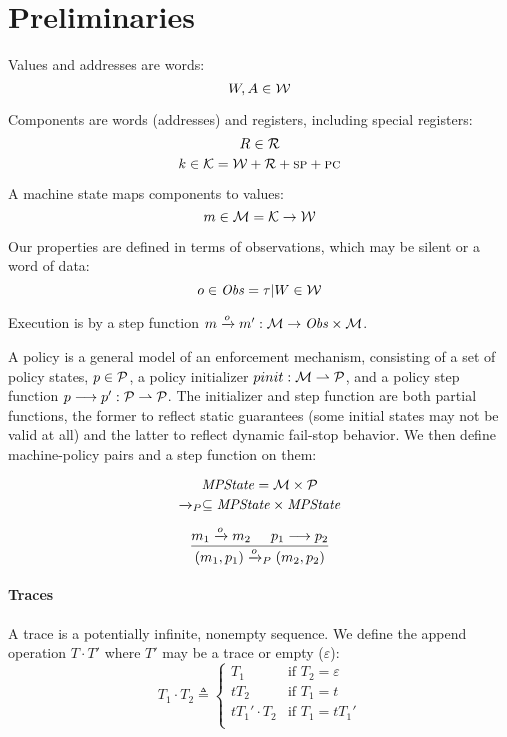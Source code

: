 \documentclass[conference]{IEEEtran}
\begin{document}
  \section{Preliminaries}

    Values and addresses are words:
    \[W,A \in {\mathcal W}\]

    Components are words (addresses) and registers, including special registers:
    \[R \in {\mathcal R}\]
    \[k \in {\mathcal K} = {\mathcal W} + {\mathcal R} + \textsc{sp} + \textsc{pc}\]

    A machine state maps components to values:
    \[m \in {\mathcal M} = {\mathcal K} \rightarrow {\mathcal W}\]

    Our properties are defined in terms of observations, which may be silent or a word of data:
    \[o \in \mathit{Obs} = \tau | W \in {\mathcal W}\]
    
    Execution is by a step function \(m \xrightarrow{o} m' : {\mathcal M} \rightarrow
    \mathit{Obs} \times {\mathcal M}\).

    A policy is a general model of an enforcement mechanism, consisting of
    a set of policy states, \(p \in \mathcal{P}\), a policy initializer
    \(pinit : {\mathcal M} \rightharpoonup \mathcal{P}\), and a policy step function \(p \longrightarrow p' :
    \mathcal{P} \rightharpoonup \mathcal{P}\). The initializer and step function are both partial functions,
    the former to reflect static guarantees (some initial states may not be valid at all) and
    the latter to reflect dynamic fail-stop behavior. We then define machine-policy pairs and
    a step function on them:

    \[\mathit{MPState} = {\mathcal M} \times \mathcal{P}\]
    \[\xrightarrow{}_P \subseteq \mathit{MPState} \times \mathit{MPState}\]

    \[\frac{m_1 \xrightarrow{o} m_2 \hspace{.5cm} p_1 \longrightarrow p_2}
           {(m_1,p_1) \xrightarrow{o}_P (m_2,p_2)}\]

  \paragraph{Traces}

    A trace is a potentially infinite, nonempty sequence. We define the append operation \(T \cdot T'\)
    where \(T'\) may be a trace or empty (\(\varepsilon\)):
    \[T_1 \cdot T_2 \triangleq
      \begin{cases}
        T_1 & \text{if } T_2 = \varepsilon \\
        t T_2 & \text{if } T_1 = t \\
        t T_1' \cdot T_2 & \text{if } T_1 = t T_1' \\
      \end{cases}\]
\end{document}
